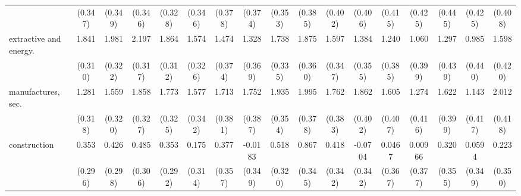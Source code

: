 {\begin{tabular}{l*{16}{c}}
                    &     (0.347)         &     (0.349)         &     (0.346)         &     (0.328)         &     (0.346)         &     (0.378)         &     (0.374)         &     (0.353)         &     (0.385)         &     (0.402)         &     (0.406)         &     (0.415)         &     (0.425)         &     (0.445)         &     (0.425)         &     (0.408)         \\
[1em]
extractive and energy.&       1.841\sym{***}&       1.981\sym{***}&       2.197\sym{***}&       1.864\sym{***}&       1.574\sym{***}&       1.474\sym{***}&       1.328\sym{***}&       1.738\sym{***}&       1.875\sym{***}&       1.597\sym{***}&       1.384\sym{***}&       1.240\sym{**} &       1.060\sym{**} &       1.297\sym{**} &       0.985\sym{*}  &       1.598\sym{***}\\
                    &     (0.310)         &     (0.322)         &     (0.317)         &     (0.312)         &     (0.326)         &     (0.374)         &     (0.369)         &     (0.335)         &     (0.360)         &     (0.347)         &     (0.355)         &     (0.385)         &     (0.399)         &     (0.439)         &     (0.440)         &     (0.420)         \\
[1em]
manufactures, sec.  &       1.281\sym{***}&       1.559\sym{***}&       1.858\sym{***}&       1.773\sym{***}&       1.577\sym{***}&       1.713\sym{***}&       1.752\sym{***}&       1.935\sym{***}&       1.995\sym{***}&       1.762\sym{***}&       1.862\sym{***}&       1.605\sym{***}&       1.274\sym{**} &       1.622\sym{***}&       1.143\sym{**} &       2.012\sym{***}\\
                    &     (0.318)         &     (0.320)         &     (0.327)         &     (0.325)         &     (0.342)         &     (0.381)         &     (0.387)         &     (0.354)         &     (0.378)         &     (0.383)         &     (0.402)         &     (0.407)         &     (0.416)         &     (0.399)         &     (0.417)         &     (0.418)         \\
[1em]
construction        &       0.353         &       0.426         &       0.485         &       0.353         &       0.175         &       0.377         &     -0.0183         &       0.518         &       0.867\sym{*}  &       0.418         &     -0.0704         &      0.0467         &     0.00966         &       0.320         &      0.0594         &       0.223         \\
                    &     (0.296)         &     (0.298)         &     (0.306)         &     (0.292)         &     (0.314)         &     (0.357)         &     (0.349)         &     (0.320)         &     (0.345)         &     (0.342)         &     (0.342)         &     (0.367)         &     (0.377)         &     (0.355)         &     (0.349)         &     (0.350)         \\

\end{tabular}}
